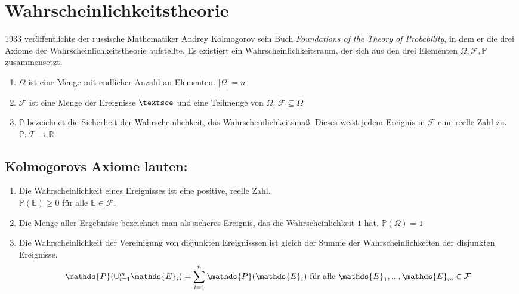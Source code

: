 


\section{Wahrscheinlichkeitstheorie}


\vspace{15pt}


1933 ver\"offentlichte der russische Mathematiker Andrey Kolmogorov sein Buch \textit{Foundations of the Theory of Probability}, in dem er die drei Axiome der Wahrscheinlichkeitstheorie aufstellte. Es existiert ein Wahrscheinlichkeitsraum, der sich aus den drei Elementen $\Omega, \mathcal{F}, \mathds{P}$ zusammensetzt.

\vspace{5pt}

\begin{enumerate}
	\item $\Omega$ ist eine Menge mit endlicher Anzahl an Elementen. $|\Omega|= n $
	\item $\mathcal{F}$ ist eine Menge der Ereignisse $\textsce $ und eine Teilmenge von $\Omega$. $\mathcal{F} \subseteq \Omega$
	\item $\mathds{P}$ bezeichnet die Sicherheit der Wahrscheinlichkeit, das Wahrscheinlichkeitsmaß. Dieses weist jedem Ereignis in $\mathcal{F}$ eine reelle Zahl zu.  $\mathds{P}: \mathcal{F} \longrightarrow \mathds{R}$
	
	
\end{enumerate}

\vspace{10pt}



\subsection *{Kolmogorovs Axiome lauten:}

\vspace{5pt}

\begin{enumerate}
	\item Die Wahrscheinlichkeit eines Ereignisses ist eine positive, reelle Zahl. \\ $\mathds{P} (\mathds{E}) \geq 0$ f\"ur alle $\mathds{E} \in \mathcal{F}$.
	\item Die Menge aller Ergebnisse bezeichnet man als sicheres Ereignis, das die Wahrscheinlichkeit $1$ hat. $\mathds{P} (\Omega) = 1$
	\item Die Wahrscheinlichkeit der Vereinigung von disjunkten Ereignisssen ist gleich der Summe der Wahrscheinlichkeiten der disjunkten Ereignisse. 
	\vspace{3pt}
	\begin{equation*}
	\mathds{P} (\cup_{i=1}^m \mathds{E}_{i}) = \sum_{i=1}^n \mathds{P} (\mathds{E}_{i})$ f\"ur alle $\mathds{E}_{1},...,\mathds{E}_{m} \in \mathcal{F}
	\end{equation*}
\end{enumerate}
\vspace{5pt}

